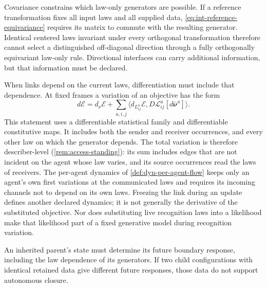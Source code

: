 Covariance constrains which law-only generators are possible. If a reference transformation fixes all input laws and all supplied data, \cref{eq:int-reference-equivariance} requires its matrix to commute with the resulting generator. Identical centered laws invariant under every orthogonal transformation therefore cannot select a distinguished off-diagonal direction through a fully orthogonally equivariant law-only rule. Directional interfaces can carry additional information, but that information must be declared.

When links depend on the current laws, differentiation must include that dependence. At fixed frames a variation of an objective has the form
\begin{equation}
d\mathcal E=d_{\nu}\mathcal E+
\sum_{a,i,j}\langle d_{L_{ij}^a}\mathcal E,
D\mathcal L_{ij}^a[d\bar{\boldsymbol\nu}^a]\rangle.
\label{eq:int-total-variation}
\end{equation}
This statement uses a differentiable statistical family and differentiable constitutive maps. It includes both the sender and receiver occurrences, and every other law on which the generator depends. The total variation is therefore describer-level (\cref{rem:access-standing}): its sum includes edges that are not incident on the agent whose law varies, and its source occurrences read the laws of receivers. The per-agent dynamics of \cref{def:dyn-per-agent-flow} keeps only an agent's own first variations at the communicated laws and requires its incoming channels not to depend on its own laws. Freezing the link during an update defines another declared dynamics; it is not generally the derivative of the substituted objective. Nor does substituting live recognition laws into a likelihood make that likelihood part of a fixed generative model during recognition variation.

An inherited parent's state must determine its future boundary response, including the law dependence of its generators. If two child configurations with identical retained data give different future responses, those data do not support autonomous closure.

